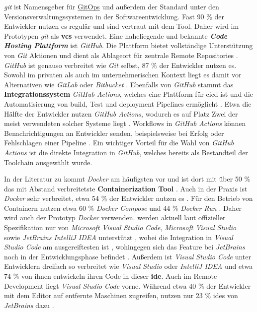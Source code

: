 \textit{\Gls{git}} ist Namensgeber für \hyperref[sec:03-03_gitops]{GitOps} und außerdem der Standard unter den Versionsverwaltungssystemen in der Softwareentwicklung. Fast 90 \% der Entwickler nutzen es regulär \cite{207:Developer-Ecosystem} und sind vertraut mit dem Tool. Daher wird im Prototypen \textit{\Gls{git}} als \textbf{\Gls{vcs}} verwendet. Eine naheliegende und bekannte \textbf{\textit{Code Hosting Plattform}} ist \textit{GitHub}. Die Plattform bietet vollständige Unterstützung von \textit{Git} Aktionen und dient als Ablageort für zentrale Remote Repositories \cite{301:About-GitHub-and-Git}. \textit{GitHub} ist genauso verbreitet wie \textit{Git} selbst, 87 \% der Entwickler nutzen es. Sowohl im privaten als auch im unternehmerischen Kontext liegt es damit vor Alternativen wie \textit{GitLab} oder \textit{Bitbucket} \cite{207:Developer-Ecosystem}. Ebenfalls von \textit{GitHub} stammt das \textbf{Integrationssystem} \textit{GitHub Actions}, welches eine Plattform für \Gls{cicd} ist und die Automatisierung von \Gls{build}, Test und \Gls{deployment} Pipelines ermöglicht \cite{302:Understanding-GitHub-Actions}. Etwa die Hälfte der Entwickler nutzen \textit{GitHub Actions}, wodurch es auf Platz Zwei der meist verwendeten solcher Systeme liegt \cite{207:Developer-Ecosystem}. Workflows in \textit{GitHub Actions} können Benachrichtigungen an Entwickler senden, beispielsweise bei Erfolg oder Fehlschlagen einer Pipeline \cite{307:Notifications-for-Workflow-Runs}. Ein wichtiger Vorteil für die Wahl von \textit{GitHub Actions} ist die direkte Integration in \textit{GitHub}, welches bereits als Bestandteil der Toolchain ausgewählt wurde.

In der Literatur zu  kommt \textit{Docker} am häufigsten vor und ist dort mit über 50 \% das mit Abstand verbreitetste \textbf{Containerization Tool} \cite{015:Containers-in-Software-Development}. Auch in der Praxis ist \textit{Docker} sehr verbreitet, etwa 54 \% der Entwickler nutzen es \cite{206:Developer-Survey-2024,207:Developer-Ecosystem}. Für den Betrieb von Containern nutzen etwa 60 \% \textit{Docker Compose} und 44 \% \textit{Docker Run} \cite{207:Developer-Ecosystem}. Daher wird auch der Prototyp \textit{Docker} verwenden.  werden aktuell laut offizieller Spezifikation nur von \textit{Microsoft Visual Studio Code}, \textit{Microsoft Visual Studio} sowie \textit{JetBrains IntelliJ IDEA} unterstützt \cite{306:Development-Containers}, wobei die Integration in \textit{Visual Studio Code} am ausgereiftesten ist \cite{204:Development-Containers-Simplified}, wohingegen sich das Feature bei \textit{JetBrains} noch in der Entwicklungsphase befindet \cite{306:Development-Containers}. Außerdem ist \textit{Visual Studio Code} unter Entwicklern dreifach so verbreitet wie \textit{Visual Studio} oder \textit{IntelliJ IDEA} und etwa 74 \% von ihnen entwickeln ihren Code in dieser \textbf{\Gls{ide}}. Auch im Remote Development liegt \textit{Visual Studio Code} vorne. Während etwa 40 \% der Entwickler mit dem Editor auf entfernte Maschinen zugreifen, nutzen nur 23 \% \Glspl{ide} von \textit{JetBrains} dazu \cite{207:Developer-Ecosystem}.

